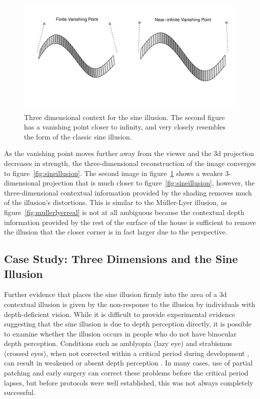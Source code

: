 \documentclass[11pt]{isuthesis}\usepackage[]{graphicx}\usepackage[]{color}
\begin{document}
\begin{figure}\centering
\includegraphics[keepaspectratio=TRUE,width=.8\linewidth, trim=0in 1.25in 0in .5in]{fig-sinedemo2}
\caption[Three-dimensional context for the sine illusion]{Three dimensional context for the sine illusion. The second figure has a vanishing point closer to infinity, and very closely resembles the form of the classic sine illusion.}\label{fig:sineillusion3d}
\end{figure}

As the vanishing point moves further away from the viewer and the 3d projection decreases in strength, the three-dimensional reconstruction of the image converges to figure~\ref{fig:sineillusion}. The second image in figure~\ref{fig:sineillusion3d} shows a weaker 3-dimensional projection that is much closer to figure~\ref{fig:sineillusion}, however, the three-dimensional contextual information provided by the shading removes much of the illusion's distortions. This is similar to the M\"uller-Lyer illusion, as figure~\ref{fig:mullerlyerreal} is not at all ambiguous because the contextual depth information provided by the rest of the surface of the house is sufficient to remove the illusion that the closer corner is in fact larger due to the perspective.

\subsection{Case Study: Three Dimensions and the Sine Illusion}
Further evidence that places the sine illusion firmly into the area of a 3d contextual illusion is given by the non-response to the illusion by individuals with depth-deficient vision. While it is difficult to provide experimental evidence suggesting that the sine illusion is due to depth perception directly, it is possible to examine whether the illusion occurs in people who do not have binocular depth perception. Conditions such as amblyopia (lazy eye) and strabismus (crossed eyes), when not corrected within a critical period during development \citep{DepthCriticalPeriod}, can result in weakened or absent depth perception \citep{StrabismusDepthPerception, BinocularDepthPerception, BinocularAmblyopia}. In many cases, use of partial patching and early surgery can correct these problems before the critical period lapses, but before protocols were well established, this was not always completely successful. 
\end{document}
